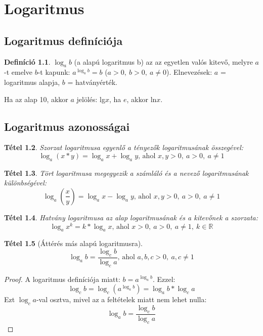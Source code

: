 \documentclass[twoside,12pt]{report}
\newtheorem{theorem}{Tétel}[section]
\theoremstyle{definition}
\newtheorem{definition}[theorem]{Definíció}
\begin{document}
\chapter{Logaritmus}
\section{Logaritmus definíciója}
	\begin{definition}
		$\log_a b$ (a alapú logaritmus b) az az egyetlen valós kitevő, melyre $a$-t emelve $b$-t kapunk: $a^{\log_a b}=b$ ($a>0,\ b>0,\ a\ne0$). Elnevezések: $a$ = logaritmus alapja, $b$ = hatványérték.
	\end{definition}
	Ha az alap 10, akkor $a$ jelölés: lg$x$, ha $e$, akkor ln$x$.
\section{Logaritmus azonosságai}
	\begin{theorem}
		Szorzat logaritmusa egyenlő a tényezők logaritmusának összegével:
		\begin{equation*}
			\log_a(x*y)=\log_ax+\log_ay\text{, ahol }x,y>0,\ a>0,\ a\ne1
		\end{equation*}
	\end{theorem}
	\begin{theorem}
		Tört logaritmusa megegyezik a számláló és a nevező logaritmusának különbségével:
		\begin{equation*}
			\log_a\left(\frac{x}{y}\right)=\log_ax-\log_ay\text{, ahol }x,y>0,\ a>0,\ a\ne1
		\end{equation*}
	\end{theorem}
	\begin{theorem}
		Hatvány logaritmusa az alap logaritmusának és a kitevőnek a szorzata:
		\begin{equation*}
			\log_a x^k=k*\log_ax\text{, ahol }x>0,\ a>0,\ a\ne1,\ k\in\mathbb{R}
		\end{equation*}
	\end{theorem}
	\begin{theorem}[Áttérés más alapú logaritmusra]
		\begin{equation*}
			\log_ab=\frac{\log_cb}{\log_ca}\text{, ahol }a,b,c>0,\ a,c\ne1
		\end{equation*}
	\end{theorem}
	\begin{proof}
		A logaritmus definíciója miatt: $b=a^{\log_ab}$. Ezzel:
		\begin{equation*}
			\log_cb=\log_c\left(a^{\log_ab}\right)=\log_ab*\log_ca
		\end{equation*}
		Ezt $\log_ca$-val osztva, mivel az a feltételek miatt nem lehet nulla:
		\begin{equation*}
			\log_ab=\frac{\log_cb}{\log_ca}
		\end{equation*}
	\end{proof}
\end{document}
